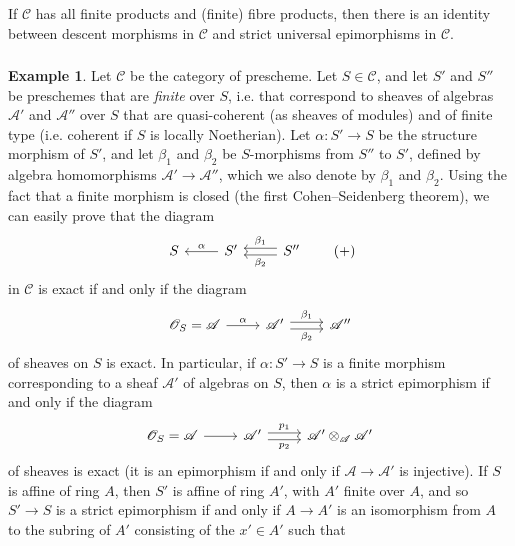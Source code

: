 \documentclass{article}
\theoremstyle{plain}
\newenvironment{proposition}[1]
  {\renewcommand\theinnercustomproposition{#1}\innercustomproposition}
  {\endinnercustomproposition}
\theoremstyle{definition}
\newtheorem*{example*}{Example}
\newcommand{\sh}[1]{{\mathscr{#1}}}
\newcommand{\cat}[1]{{\mathcal{#1}}}
\newcommand{\oldpage}[1]{\marginpar{\footnotesize$\Big\vert$ \textit{p.~#1}}}
\begin{document}
\begin{proposition}{2.1}
  If $\cat{C}$ has all finite products and (finite) fibre products, then there is an identity between descent morphisms in $\cat{C}$ and strict universal epimorphisms in $\cat{C}$.
\end{proposition}


\subsubsection{}
\label{A.2.b}

\begin{example*}
  Let $\cat{C}$ be the category of prescheme.
  Let $S\in\cat{C}$, and let $S'$ and $S''$ be preschemes that are \emph{finite} over $S$, i.e. that correspond to sheaves of algebras $\sh{A}'$ and $\sh{A}''$ over $S$ that are quasi-coherent (as sheaves of modules) and of finite type (i.e. coherent if $S$ is locally Noetherian).
  Let $\alpha\colon S'\to S$ be the structure morphism of $S'$, and let $\beta_1$ and $\beta_2$ be $S$-morphisms from $S''$ to $S'$, defined by algebra homomorphisms $\sh{A}'\to\sh{A}''$, which we also denote by $\beta_1$ and $\beta_2$.
  Using the fact that a finite morphism is closed (the first Cohen--Seidenberg theorem), we can easily prove that the diagram
  \[
  \label{equation-example:A.2.b}
    \begin{tikzcd}
      S
      & S' \lar[swap,"\alpha"]
      & S'' \lar[shift left=1,"\beta_2"] \lar[shift right=1,swap,"\beta_1"]
    \end{tikzcd}
  \tag{+}
  \]
  in $\cat{C}$ is exact if and only if the diagram
\oldpage{190-08}
  \[
    \begin{tikzcd}
      \sh{O}_S = \sh{A} \rar["\alpha"]
      & \sh{A}' \rar[shift left=1,"\beta_1"] \rar[shift right=1,swap,"\beta_2"]
      & \sh{A}''
    \end{tikzcd}
  \]
  of sheaves on $S$ is exact.
  In particular, if $\alpha\colon S'\to S$ is a finite morphism corresponding to a sheaf $\sh{A}'$ of algebras on $S$, then $\alpha$ is a strict epimorphism if and only if the diagram
  \[
    \begin{tikzcd}
      \sh{O}_S = \sh{A} \rar
      & \sh{A}' \rar[shift left=1,"p_1"] \rar[shift right=1,swap,"p_2"]
      & \sh{A}'\otimes_{\sh{A}}\sh{A}'
    \end{tikzcd}
  \]
  of sheaves is exact (it is an epimorphism if and only if $\sh{A}\to\sh{A}'$ is injective).
  If $S$ is affine of ring $A$, then $S'$ is affine of ring $A'$, with $A'$ finite over $A$, and so $S'\to S$ is a strict epimorphism if and only if $A\to A'$ is an isomorphism from $A$ to the subring of $A'$ consisting of the $x'\in A'$ such that

\end{example*}
\end{document}

